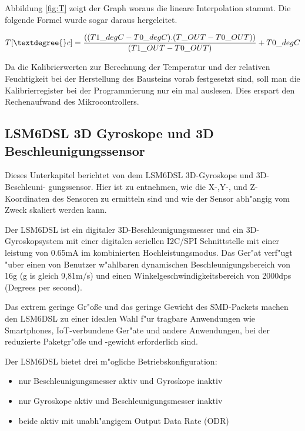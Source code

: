 Abbildung \ref{fig:T} zeigt der Graph woraus die lineare Interpolation 
stammt. Die folgende Formel wurde sogar daraus hergeleitet.

\begin{center}
	\[
	T[\textdegree{}c] = \frac{((T1\_degC - T0\_degC) . (T\_OUT - 
	T0\_OUT))}{(T1\_OUT - T0\_OUT) } + T0\_degC  
	\]\label{TempFormel}
\end{center}

Da die Kalibrierwerten zur Berechnung der Temperatur und der relativen 
Feuchtigkeit bei der Herstellung des Bausteins vorab festgesetzt sind, 
soll man die Kalibrierregister bei der Programmierung nur ein mal 
auslesen. Dies erspart den Rechenaufwand des Mikrocontrollers.
 
\subsection{LSM6DSL 3D Gyroskope und 3D Beschleunigungssensor}\label{Acc/Gy}

Dieses Unterkapitel berichtet von dem LSM6DSL 3D-Gyroskope und 
3D-Beschleuni- gungssensor. Hier ist zu entnehmen, wie die X-,Y-, und 
Z-Koordinaten des Sensoren zu ermitteln sind und wie der Sensor 
abh"angig vom Zweck skaliert werden kann.
 

Der LSM6DSL ist ein digitaler 3D-Beschleunigungsmesser und ein 
3D-Gyroskopsystem mit einer digitalen seriellen I2C/SPI Schnittstelle 
mit einer leistung von 0.65mA im kombinierten Hochleistungsmodus.
Das Ger"at verf"ugt "uber einen von Benutzer w"ahlbaren dynamischen 
Beschleunigungsbereich von  \textbar {} \textbar 
{} \textbar \textpm 16g (g is gleich 9,81m/s) und einen 
Winkelgeschwindigkeitsbereich von  \textbar {} 
\textbar {} \textbar {} \textbar \textpm 2000dps 
(Degrees per second).
 
Das extrem geringe Gr"o\ss{}e und das geringe Gewicht des SMD-Packets 
machen den LSM6DSL zu einer idealen Wahl f"ur tragbare Anwendungen wie 
Smartphones, IoT-verbundene Ger"ate und andere Anwendungen, bei der 
reduzierte Paketgr"o\ss{}e und -gewicht erforderlich sind.  

Der LSM6DSL bietet drei m"ogliche Betriebskonfiguration:
\begin{itemize}
	\item nur Beschleunigungsmesser aktiv und Gyroskope inaktiv
	\item nur Gyroskope aktiv und Beschleunigungsmesser inaktiv
	\item beide aktiv mit unabh"angigem Output Data Rate (ODR) 
\end{itemize}

